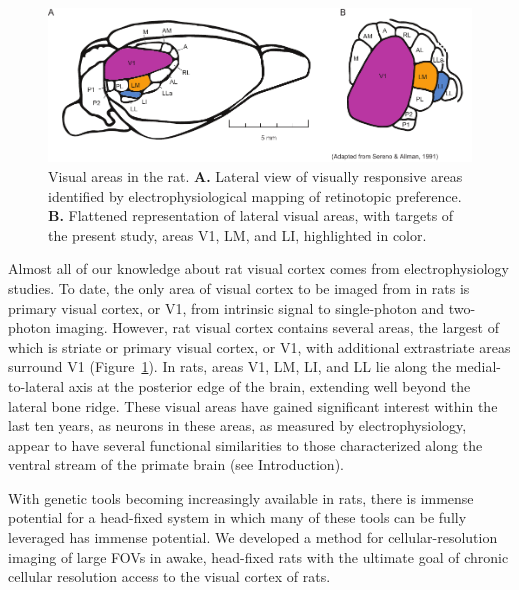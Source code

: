 \begin{figure}[t!]
    \includegraphics[width=\textwidth]{figures/chapter_2/fig_2-1_rat_visual_areas/fig_2-1_rat_visual_areas.pdf}
    \vspace{.1in}
    \caption[Visual areas in the rat]{Visual areas in the rat. \textbf{A.} Lateral view of visually responsive areas identified by electrophysiological mapping of retinotopic preference. \textbf{B.} Flattened representation of lateral visual areas, with targets of the present study, areas V1, LM, and LI, highlighted in color. 
    \label{fig:rat_visual_areas}}
\end{figure}

Almost all of our knowledge about rat visual cortex comes from electrophysiology studies. To date, the only area of visual cortex to be imaged from in rats is primary visual cortex, or V1, from intrinsic signal \cite{Gias2004} to single-photon \cite{Scott2018ImagingMacroscope} and two-photon \cite{Ohki2005, Greenberg2008} imaging. However, rat visual cortex contains several areas, the largest of which is striate or primary visual cortex, or V1, with additional extrastriate areas surround V1 \cite{Espinoza1983RetinotopicRat, Sereno1991} (Figure~\ref{fig:rat_visual_areas}). In rats, areas V1, LM, LI, and LL lie along the medial-to-lateral axis at the posterior edge of the brain, extending well beyond the lateral bone ridge. These visual areas have gained significant interest within the last ten years, as neurons in these areas, as measured by electrophysiology, appear to have several functional similarities to those characterized along the ventral stream of the primate brain (see Introduction). 

With genetic tools becoming increasingly available in rats, there is immense potential for a head-fixed system in which many of these tools can be fully leveraged has immense potential. We developed a method for cellular-resolution imaging of large FOVs in awake, head-fixed rats with the ultimate goal of chronic cellular resolution access to the visual cortex of rats. 

